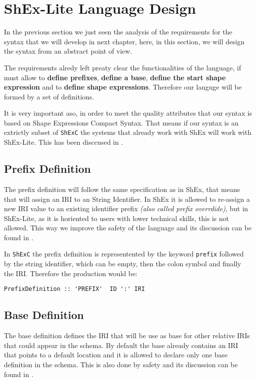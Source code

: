\section{ShEx-Lite Language Design}

In the previous section we just seen the analysis of the requirements for the
syntax that we will develop in next chapter, here, in this section, we will
design the syntax from an abstract point of view.

The requirements alredy left preaty clear the functionalities of the language,
if must allow to \textbf{define prefixes}, \textbf{define a base}, \textbf{define the start shape expression}
and to \textbf{define shape expressions}. Therefore our languge will be formed by a set of definitions.

It is very important aso, in order to meet the quality attributes that our syntax is based on Shape Expressions
Compact Syntax. That means if our syntax is an extrictly subset of \texttt{ShExC} the systems that already
work with ShEx will work with ShEx-Lite. This has been disccused in .

\subsection{Prefix Definition}
The prefix definition will follow the same specification as in ShEx, that means that will assign an IRI to an String Identifier.
In ShEx it is allowed to re-assign a new IRI value to an existing identifier prefix \textit{(also called prefix overrdide)},
but in ShEx-Lite, as it is horiented to users with lower technical skills, this is not allowed.
This way we improve the safety of the language and its discussion can be found in .

In \texttt{ShExC} the prefix definition is representented by the keyword \texttt{prefix} followed by the string identifier, which can
be empty, then the colon symbol and finally the IRI. Therefore the production would be:

\begin{center}
    \begin{verbatim}
PrefixDefinition :: 'PREFIX'  ID ':' IRI
    \end{verbatim}
\end{center}

\subsection{Base Definition}
The base definition defines the IRI that will be use as base for other relative IRIs that could appear in the schema. By default the base
already contains an IRI that points to a default location and it is allowed to declare only one base definition in the schema. This is also done
by safety and its discussion can be found in .

